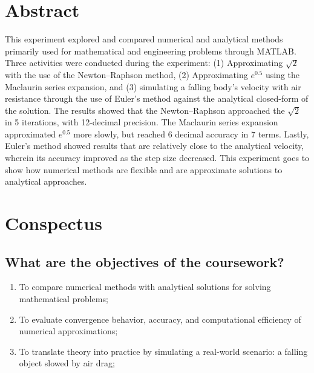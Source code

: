 
\maketitle %






\section{Abstract}
    This experiment explored and compared numerical and analytical methods primarily used for
    mathematical and engineering problems through MATLAB. Three activities were conducted
    during the experiment: (1) Approximating $\sqrt{2}$ with the use of the Newton–Raphson
    method, (2) Approximating $e^{0.5}$ using the Maclaurin series expansion, and (3)
    simulating a falling body’s velocity with air resistance through the use of Euler’s method
    against the analytical closed-form of the solution. The results showed that the Newton–Raphson approached the $\sqrt{2}$ in 5 iterations, with 12-decimal precision. The Maclaurin series expansion approximated $e^{0.5}$ more slowly, but reached 6 decimal accuracy in 7 terms. Lastly, Euler’s method showed results that are relatively close to the analytical velocity, wherein its accuracy improved as the step size decreased. This experiment goes to show how numerical methods are flexible and are approximate solutions to analytical approaches.


\section{Conspectus}
\label{sec:cnspcts}

\IEEEpubidadjcol %

\subsection{What are the objectives of the coursework?}

\begin{enumerate}
\item To compare numerical methods with analytical solutions for solving mathematical problems;
\item To evaluate convergence behavior, accuracy, and computational efficiency of numerical approximations;
\item To translate theory into practice by simulating a real-world scenario: a falling object slowed by air drag;
\end{enumerate}	
	
